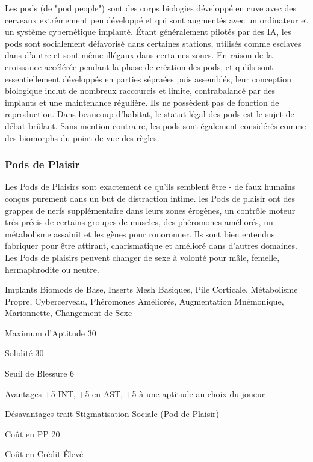 Les pods (de "pod people") sont des corps biologies développé en cuve avec des cerveaux extrêmement peu développé et qui sont augmentés avec un ordinateur et un système cybernétique implanté. Étant généralement pilotés par des IA, les pods sont socialement défavorisé dans certaines stations, utilisés comme esclaves dans d'autre et sont même illégaux dans certaines zones. En raison de la croissance accélérée pendant la phase de création des pods, et qu'ils sont essentiellement développés en parties sépraées puis assemblés, leur conception biologique inclut de nombreux raccourcis et limite, contrabalancé par des implants et une maintenance régulière. Ils ne possèdent pas de fonction de reproduction. Dans beaucoup d'habitat, le statut légal des pods est le sujet de débat brûlant. Sans mention contraire, les pods sont également considérés comme des biomorphs du point de vue des règles. 

\subsubsection{Pods de Plaisir} \label{sec:starting-pleasure-pods} 

Les Pods de Plaisirs sont exactement ce qu'ils semblent être - de faux humains conçus purement dans un but de distraction intime. les Pods de plaisir ont des grappes de nerfs supplémentaire dans leurs zones érogènes, un contrôle moteur trés précis de certains groupes de muscles, des phéromones améliorés, un métabolisme assainit et les gènes pour ronoronner. Ils sont bien entendus fabriquer pour être attirant, charismatique et amélioré dans d'autres domaines. Les Pods de plaisirs peuvent changer de sexe à volonté pour mâle, femelle, hermaphrodite ou neutre. 

\begin{description*} \item[Implants] Biomods de Base, Inserts Mesh Basiques, Pile Corticale, Métabolisme Propre, Cybercerveau, Phéromones Améliorés, Augmentation Mnémonique, Marionnette, Changement de Sexe\item[Maximum d'Aptitude] 30 \item[Solidité] 30 \item[Seuil de Blessure] 6 \item[Avantages] +5 INT, +5 en AST, +5 à une aptitude au choix du joueur\item[Désavantages] trait Stigmatisation Sociale (Pod de Plaisir) \item [Coût en PP] 20 \item[Coût en Crédit] Élevé \end{description*} 

